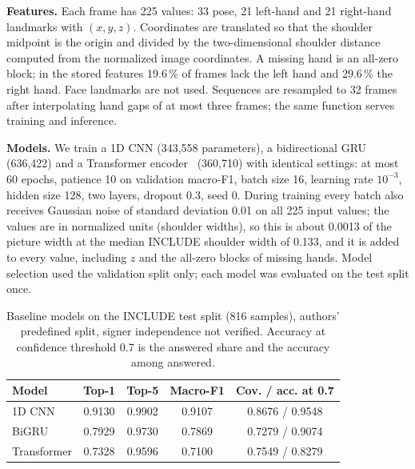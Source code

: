 \documentclass[conference]{IEEEtran}
\begin{document}
\textbf{Features.} Each frame has 225 values: 33 pose, 21 left-hand and 21 right-hand landmarks with $(x,y,z)$. Coordinates are translated so that the shoulder midpoint is the origin and divided by the two-dimensional shoulder distance computed from the normalized image coordinates. A missing hand is an all-zero block; in the stored features 19.6\,\% of frames lack the left hand and 29.6\,\% the right hand. Face landmarks are not used. Sequences are resampled to 32 frames after interpolating hand gaps of at most three frames; the same function serves training and inference.

\textbf{Models.} We train a 1D CNN (343,558 parameters), a bidirectional GRU~\cite{cho2014gru,schuster1997birnn} (636,422) and a Transformer encoder~\cite{vaswani2017attention} (360,710) with identical settings: at most 60 epochs, patience 10 on validation macro-F1, batch size 16, learning rate $10^{-3}$, hidden size 128, two layers, dropout 0.3, seed 0. During training every batch also receives Gaussian noise of standard deviation 0.01 on all 225 input values; the values are in normalized units (shoulder widths), so this is about 0.0013 of the picture width at the median INCLUDE shoulder width of 0.133, and it is added to every value, including $z$ and the all-zero blocks of missing hands. Model selection used the validation split only; each model was evaluated on the test split once.

\begin{table}[t]
\caption{Baseline models on the INCLUDE test split (816 samples), authors' predefined split, signer independence not verified. Accuracy at confidence threshold 0.7 is the answered share and the accuracy among answered.}
\label{tab:base}
\centering
\small
\setlength{\tabcolsep}{4pt}
\begin{tabular}{lcccc}
\hline
Model & Top-1 & Top-5 & Macro-F1 & Cov. / acc. at 0.7\\
\hline
1D CNN & 0.9130 & 0.9902 & 0.9107 & 0.8676 / 0.9548\\
BiGRU & 0.7929 & 0.9730 & 0.7869 & 0.7279 / 0.9074\\
Transformer & 0.7328 & 0.9596 & 0.7100 & 0.7549 / 0.8279\\
\hline
\end{tabular}
\end{table}
\end{document}
